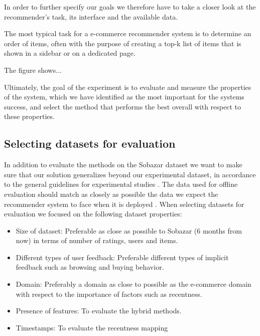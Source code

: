 
In order to further specify our goals we therefore have to take a closer look at the recommender's task,
its interface and the available data.

The most typical task for a e-commerce recommender system is to determine an order of items,
often with the purpose of creating a top-k list of items that is shown in a sidebar or on a
dedicated page.


The figure shows...


Ultimately, the goal of the experiment is to evaluate and measure the properties
of the system, which we have identified as the most important for the systems success,
and select the method that performs the best overall with respect to these properties.

\subsection{Selecting datasets for evaluation}

In addition to evaluate the methods on the Sobazar dataset we want to make sure that our
solution generalizes beyond our experimental dataset, in accordance to the general guidelines
for experimental studies \cite{Shani2011}. The data used for offline evaluation should match
as closely as possible the data we expect the recommender system to face when it is
deployed \cite{Gunawardana2009}. When selecting datasets for evaluation we focused on the
following dataset properties:

\begin{itemize}
	\item Size of dataset: Preferable as close as possible to Sobazar (6 months from now)
	in terms of number of ratings, users and items.
	\item Different types of user feedback: Preferable different types of implicit feedback
	such as browsing and buying behavior.
	\item Domain: Preferably a domain as close to possible as the e-commerce domain with respect
	to the importance of factors such as recentness.
	\item Presence of features: To evaluate the hybrid methods.
	\item Timestamps: To evaluate the recentness mapping
\end{itemize}

